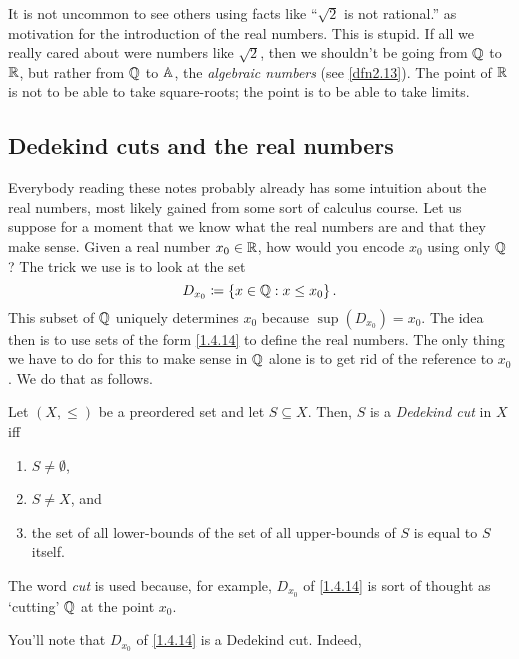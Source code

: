 \begin{rmk}
It is not uncommon to see others using facts like ``$\sqrt{2}$ is not rational.'' as motivation for the introduction of the real numbers.  This is stupid.  If all we really cared about were numbers like $\sqrt{2}$, then we shouldn't be going from $\mathbb{Q}$ to $\mathbb{R}$, but rather from $\mathbb{Q}$ to $\mathbb{A}$, the \emph{algebraic numbers} (see \cref{dfn2.13}).  The point of $\mathbb{R}$ is not to be able to take square-roots; the point is to be able to take limits.
\end{rmk}

\subsection{Dedekind cuts and the real numbers}\label{sbs1.4.2}

Everybody reading these notes probably already has some intuition about the real numbers, most likely gained from some sort of calculus course.  Let us suppose for a moment that we know what the real numbers are and that they make sense.  Given a real number $x_0\in \mathbb{R}$, how would you encode $x_0$ using only $\mathbb{Q}$?  The trick we use is to look at the set
\begin{equation}\label{1.4.14}
D_{x_0}\coloneqq \left\{ x\in \mathbb{Q} :x\leq x_0\right\} .
\end{equation}
This subset of $\mathbb{Q}$ uniquely determines $x_0$ because $\sup (D_{x_0})=x_0$.  The idea then is to use sets of the form \eqref{1.4.14} to define the real numbers.  The only thing we have to do for this to make sense in $\mathbb{Q}$ alone is to get rid of the reference to $x_0$.  We do that as follows.
\begin{dfn}
Let $(X,\leq )$ be a preordered set and let $S\subseteq X$.  Then, $S$ is a \emph{Dedekind cut} in $X$ iff
\begin{enumerate}
\item $S\neq \emptyset$, 
\item $S\neq X$, and
\item the set of all lower-bounds of the set of all upper-bounds of $S$ is equal to $S$ itself.
\end{enumerate}
\begin{rmk}
The word \emph{cut} is used because, for example, $D_{x_0}$ of \eqref{1.4.14} is sort of thought as `cutting' $\mathbb{Q}$ at the point $x_0$.
\end{rmk}
\end{dfn}
You'll note that $D_{x_0}$ of \eqref{1.4.14} is a Dedekind cut.  Indeed,
